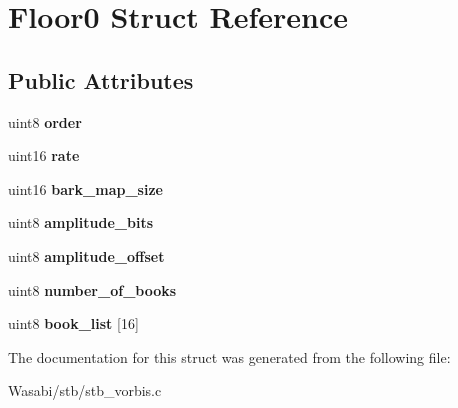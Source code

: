 \hypertarget{struct_floor0}{}\section{Floor0 Struct Reference}
\label{struct_floor0}
\subsection*{Public Attributes}
\begin{DoxyCompactItemize}
\item 
uint8 {\bfseries order}\hypertarget{struct_floor0_a4f6f2873ce6067d00a46711f1a77cc64}{}\label{struct_floor0_a4f6f2873ce6067d00a46711f1a77cc64}

\item 
uint16 {\bfseries rate}\hypertarget{struct_floor0_a922586e1bbbe9c1729764ce4e9c58081}{}\label{struct_floor0_a922586e1bbbe9c1729764ce4e9c58081}

\item 
uint16 {\bfseries bark\+\_\+map\+\_\+size}\hypertarget{struct_floor0_ad25748f935add45259c7739644c3dfde}{}\label{struct_floor0_ad25748f935add45259c7739644c3dfde}

\item 
uint8 {\bfseries amplitude\+\_\+bits}\hypertarget{struct_floor0_a49a1999f7063382cf289e36f3f679281}{}\label{struct_floor0_a49a1999f7063382cf289e36f3f679281}

\item 
uint8 {\bfseries amplitude\+\_\+offset}\hypertarget{struct_floor0_a2c57037c224748b8bb5586f668a66903}{}\label{struct_floor0_a2c57037c224748b8bb5586f668a66903}

\item 
uint8 {\bfseries number\+\_\+of\+\_\+books}\hypertarget{struct_floor0_ab72ef807e63af61f9e473752753b135a}{}\label{struct_floor0_ab72ef807e63af61f9e473752753b135a}

\item 
uint8 {\bfseries book\+\_\+list} \mbox{[}16\mbox{]}\hypertarget{struct_floor0_a9c9a2f623bc164826e892f7d75c484f2}{}\label{struct_floor0_a9c9a2f623bc164826e892f7d75c484f2}

\end{DoxyCompactItemize}


The documentation for this struct was generated from the following file\+:\begin{DoxyCompactItemize}
\item 
Wasabi/stb/stb\+\_\+vorbis.\+c\end{DoxyCompactItemize}
